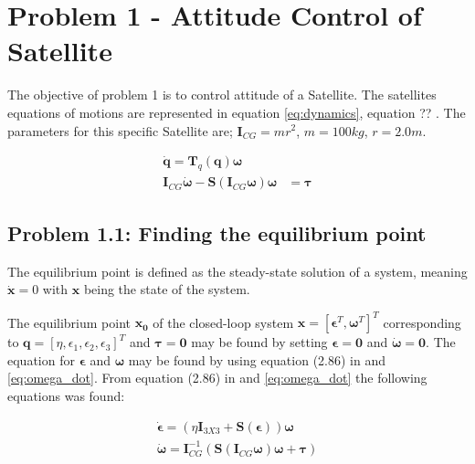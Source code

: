 \section*{Problem 1 - Attitude Control of Satellite}

The objective of problem 1 is to control attitude of a Satellite. The satellites equations of motions are represented in equation \eqref{eq:dynamics}, equation ??  \cite{Fossen2011}. The parameters for this specific Satellite are; $\mathbf{I}_{CG} = mr^2$, $m = 100 kg$, $r = 2.0 m$. 

\begin{subequations}
\label{eq:dynamics}
	\begin{align}
		\dot{\mathbf{q}} = \mathbf{T}_q (\mathbf{q} ) \boldsymbol{\omega} \\
		\mathbf{I}_{CG} \dot{\boldsymbol{\omega}} - \mathbf{S} (\mathbf{I}_{CG} \boldsymbol{\omega} ) \boldsymbol{\omega} & =  \boldsymbol{\tau} \label{eq:omega_dot}
	\end{align}	
\end{subequations}



\subsection*{Problem 1.1: Finding the equilibrium point} 

The equilibrium point is defined as the steady-state solution of a system, meaning $\dot{\mathbf{x}} = 0$ with $\mathbf{x}$ being the state of the system.


The equilibrium point $\mathbf{x_0}$ of the closed-loop system $\mathbf{x} = [ \boldsymbol{\epsilon}^T, \boldsymbol{\omega}^T]^T$ corresponding to $\mathbf{q} = [\eta,\epsilon_1, \epsilon_2, \epsilon_3]^T$ and $\boldsymbol{\tau} = \boldsymbol{0}$ may be found by setting $\boldsymbol{\epsilon} = \mathbf{0}$ and $\dot{\boldsymbol{\omega}} = \mathbf{0}$. The equation for $\boldsymbol{\epsilon}$ and $\boldsymbol{\omega}$ may be found by using equation (2.86) in \cite{Fossen2011} and \eqref{eq:omega_dot}. From equation (2.86) in \cite{Fossen2011} and \eqref{eq:omega_dot} the following equations was found:


\begin{subequations}
\label{eq:dynamics}
	\begin{align}
		\dot{\boldsymbol{\epsilon}} =  (\eta \mathbf{I}_{3X3} + \mathbf{S}(\boldsymbol{\epsilon}) ) \boldsymbol{\omega} \\
		 \dot{\boldsymbol{\omega}} = \mathbf{I}_{CG}^{-1} (\mathbf{S} (\mathbf{I}_{CG} \boldsymbol{\omega} ) \boldsymbol{\omega} +  \boldsymbol{\tau})
	\end{align}	
\end{subequations}







